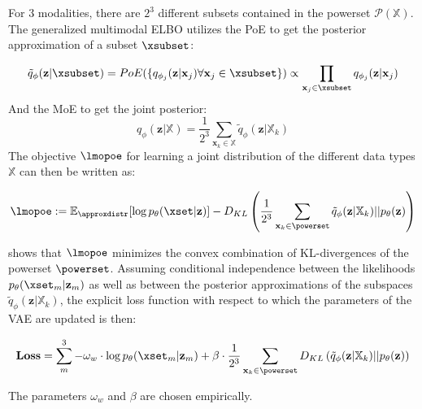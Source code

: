 For 3 modalities, there are $2^3$ different subsets contained in the powerset $\mathcal{P}(\mathbb{X})$.
The generalized multimodal ELBO utilizes the PoE to get the posterior approximation of a subset $\xsubset$:

\begin{equation}
    \tilde{q}_{\phi}(\textbf{z}|\xsubset)=PoE(\{q_{\phi_j}(\textbf{z}|\textbf{x}_j) \forall \textbf{x}_j \in \xsubset\}) \propto \prod _{\textbf{x}_j \in \xsubset}q_{\phi_j}(\textbf{z}|\textbf{x}_j)
\end{equation}
And the MoE to get the joint posterior:
\begin{equation}
    q_{\phi}(\textbf{z}|\mathbb{X}) = \frac{1}{2^3} \sum _{\textbf{x}_k \in \mathbb{X}} \tilde{q}_{\phi} (\textbf{z}|\mathbb{X}_k)
\end{equation}
The objective $\lmopoe$ for learning a joint distribution of the different data types $\mathbb{X}$ can then be written as:

\begin{equation}
    \lmopoe := \mathbb{E}_{\approxdistr}[\log p_{\theta}(\xset|\textbf{z})] - D_{KL} \left( \frac{1}{2^3} \sum _{\textbf{x}_k \in \powerset} \tilde{q}_{\phi} (\textbf{z}|\mathbb{X}_k)||p_{\theta}(\textbf{z})\right)
\end{equation}

\cite{thomas_gener-ELBO} shows that $\lmopoe$ minimizes the convex combination of KL-divergences of the powerset $\powerset$.
Assuming conditional independence between the likelihoods $p_{\theta}(\xset _m|\textbf{z} _m)$ as well as between the posterior approximations of the subspaces $\tilde{q}_{\phi}(\textbf{z}|\mathbb{X}_k)$, the explicit loss function with respect to which the parameters of the VAE are updated is then:

\begin{equation}
    \label{explicit_loss}
    \textbf{Loss} = \sum _m ^{3} -\omega _w \cdot \log p_{\theta}(\xset_m|\textbf{z}_m) + \beta \cdot \frac{1}{2^3} \sum _{\textbf{x}_k \in \powerset} D_{KL} \left(\tilde{q}_{\phi}(\textbf{z}|\mathbb{X}_k)||p_{\theta}(\textbf{z})\right)
\end{equation}

The parameters $\omega _w$ and $\beta$ are chosen empirically.

